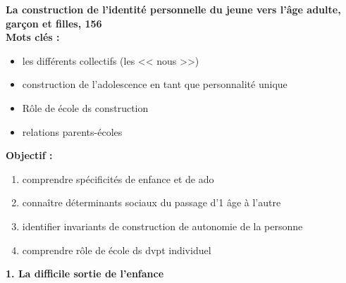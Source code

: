 \documentclass[12pt]{article}
\begin{document}
\textbf{La construction de l'identité personnelle du jeune vers l'âge adulte, garçon et filles, 156} \\

\textbf{Mots clés : }
\begin{itemize}
\item les différents collectifs (les << nous >>)
\item construction de l'adolescence en tant que personnalité unique
\item Rôle de école ds construction
\item relations parents-écoles
\end{itemize}

\vspace{0.5cm}

\textbf{Objectif :}


\begin{enumerate}
\item comprendre spécificités de enfance et de ado
\item connaître déterminants sociaux du passage d'1 âge à l'autre
\item identifier invariants de construction de autonomie de la personne
\item comprendre rôle de école ds dvpt individuel \\
\end{enumerate}

\textbf{1. La difficile sortie de l'enfance} \\
\end{document}
